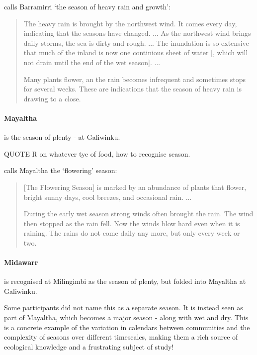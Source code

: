 \citet{davis1989} calls Barramirri `the season of heavy rain and growth':
\blockquote{
    The heavy rain is brought by the northwest wind. It comes every day, indicating that the seasons have changed. ...
    As the northwest wind brings daily storms, the sea is dirty and rough. ...
    The inundation is so extensive that much of the inland is now one continious sheet of water [, which will not drain until the end of the wet season]. ...
    
    Many plants flower, an the rain becomes infrequent and sometimes stops for several weeks.
    These are indications that the season of heavy rain is drawing to a close.
}


\paragraph{Mayaltha} is the season of plenty - at Galiwinku.  

QUOTE R on whatever tye of food, how to recognise season.

\citet{davis1989} calls Mayaltha the `flowering' season:
\blockquote{
    [The Flowering Season] is marked by an abundance of plants that flower, bright sunny days, cool breezes, and occasional rain. ...
    
    During the early wet season strong winds often brought the rain.
    The wind then stopped as the rain fell.
    Now the winds blow hard even when it is raining.
    The rains do not come daily any more, but only every week or two.
}


\paragraph{Midawarr} is recognised at Milingimbi as the season of plenty, but folded into Mayaltha at Galiwinku.

Some participants did not name this as a separate season.
It is instead seen as part of Mayaltha, which becomes a major season - along with wet and dry.
This is a concrete example of the variation in calendars between communities and the complexity of seasons over different timescales,
making them a rich source of ecological knowledge and a frustrating subject of study!

